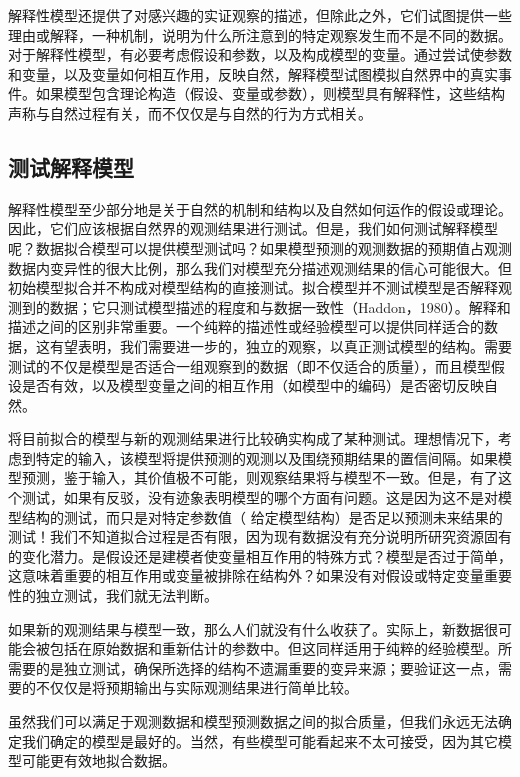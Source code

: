 \documentclass[
  lang=cn,
  11pt,
  scheme=chinese,
  chinesefont=nofont,
  citestyle=gb7714-2015,
  bibstyle=gb7714-2015]{elegantbook}
\begin{document}
解释性模型还提供了对感兴趣的实证观察的描述，但除此之外，它们试图提供一些理由或解释，一种机制，说明为什么所注意到的特定观察发生而不是不同的数据。对于解释性模型，有必要考虑假设和参数，以及构成模型的变量。通过尝试使参数和变量，以及变量如何相互作用，反映自然，解释模型试图模拟自然界中的真实事件。如果模型包含理论构造（假设、变量或参数），则模型具有解释性，这些结构声称与自然过程有关，而不仅仅是与自然的行为方式相关。

\subsection{测试解释模型}\label{ux6d4bux8bd5ux89e3ux91caux6a21ux578b}

解释性模型至少部分地是关于自然的机制和结构以及自然如何运作的假设或理论。因此，它们应该根据自然界的观测结果进行测试。但是，我们如何测试解释模型呢？数据拟合模型可以提供模型测试吗？如果模型预测的观测数据的预期值占观测数据内变异性的很大比例，那么我们对模型充分描述观测结果的信心可能很大。但初始模型拟合并不构成对模型结构的直接测试。拟合模型并不测试模型是否解释观测到的数据；它只测试模型描述的程度和与数据一致性（Haddon，1980）。解释和描述之间的区别非常重要。一个纯粹的描述性或经验模型可以提供同样适合的数据，这有望表明，我们需要进一步的，独立的观察，以真正测试模型的结构。需要测试的不仅是模型是否适合一组观察到的数据（即不仅适合的质量），而且模型假设是否有效，以及模型变量之间的相互作用（如模型中的编码）是否密切反映自然。

将目前拟合的模型与新的观测结果进行比较确实构成了某种测试。理想情况下，考虑到特定的输入，该模型将提供预测的观测以及围绕预期结果的置信间隔。如果模型预测，鉴于输入，其价值极不可能，则观察结果将与模型不一致。但是，有了这个测试，如果有反驳，没有迹象表明模型的哪个方面有问题。这是因为这不是对模型结构的测试，而只是对特定参数值（ 给定模型结构）是否足以预测未来结果的测试！我们不知道拟合过程是否有限，因为现有数据没有充分说明所研究资源固有的变化潜力。是假设还是建模者使变量相互作用的特殊方式？模型是否过于简单，这意味着重要的相互作用或变量被排除在结构外？如果没有对假设或特定变量重要性的独立测试，我们就无法判断。

如果新的观测结果与模型一致，那么人们就没有什么收获了。实际上，新数据很可能会被包括在原始数据和重新估计的参数中。但这同样适用于纯粹的经验模型。所需要的是独立测试，确保所选择的结构不遗漏重要的变异来源；要验证这一点，需要的不仅仅是将预期输出与实际观测结果进行简单比较。

虽然我们可以满足于观测数据和模型预测数据之间的拟合质量，但我们永远无法确定我们确定的模型是最好的。当然，有些模型可能看起来不太可接受，因为其它模型可能更有效地拟合数据。
\end{document}
